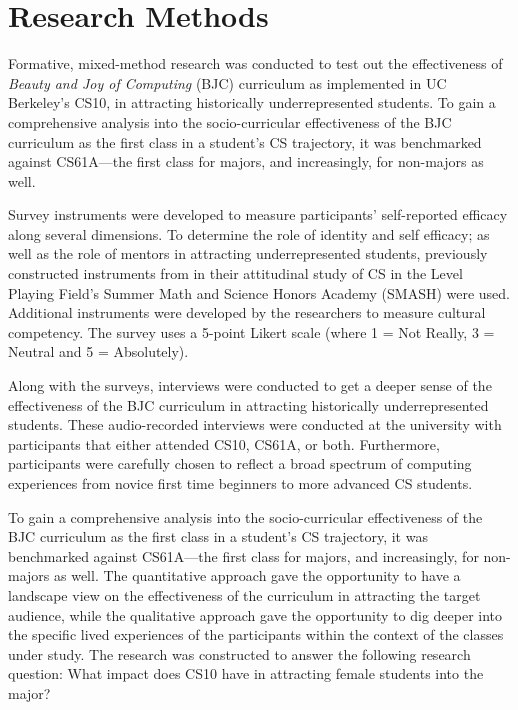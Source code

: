 \documentclass[twoside,openright,titlepage,numbers=noenddot,headinclude,%
               footinclude=true,cleardoublepage=empty,abstractoff,BCOR=5mm,%
               paper=a4,fontsize=11pt,ngerman,american]{scrreprt}
\numberwithin{theorem}{chapter}
\numberwithin{definition}{chapter}
\numberwithin{algorithm}{chapter}
\numberwithin{figure}{chapter}
\numberwithin{table}{chapter}
\numberwithin{equation}{chapter}
\begin{document}
\section *{Research Methods}

Formative, mixed-method research was conducted to test out the effectiveness of \emph{Beauty and Joy of Computing} (BJC) curriculum as implemented in UC Berkeley's CS10, in attracting historically underrepresented students. To gain a comprehensive analysis into the socio-curricular effectiveness of the BJC curriculum as the first class in a student's CS trajectory, it was benchmarked against CS61A---the first class for majors, and increasingly, for non-majors as well. 

Survey instruments were developed to measure participants' self-reported efficacy along several dimensions. To determine the role of identity and self efficacy; as well as the role of mentors in attracting underrepresented students, previously constructed instruments from \cite{Martin:2013fk} in their attitudinal study of CS in the Level Playing Field's Summer Math and Science Honors Academy (SMASH) were used. Additional instruments were developed by the researchers to measure cultural competency. The survey uses a 5-point Likert scale (where 1 = Not Really, 3 = Neutral and 5 = Absolutely).

Along with the surveys, interviews were conducted to get a deeper sense of the effectiveness of the BJC curriculum in attracting historically underrepresented students. These audio-recorded interviews were conducted at the university with participants that either attended CS10, CS61A, or both. Furthermore, participants were carefully chosen to reflect a broad spectrum of computing experiences from novice first time beginners to more advanced CS students. 

To gain a comprehensive analysis into the socio-curricular effectiveness of the BJC curriculum as the first class in a student's CS trajectory, it was benchmarked against CS61A---the first class for majors, and increasingly, for non-majors as well. The quantitative approach gave the opportunity to have a landscape view on the effectiveness of the curriculum in attracting the target audience, while the qualitative approach gave the opportunity to dig deeper into the specific lived experiences of the participants within the context of the classes under study. The research was constructed to answer the following research question: What impact does CS10 have in attracting female students into the major?
\end{document}
